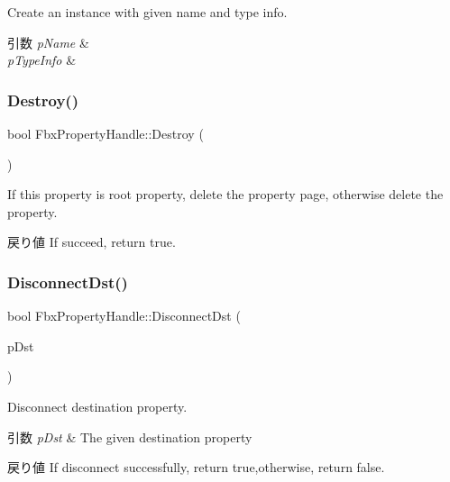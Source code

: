 Create an instance with given name and type info. 
\begin{DoxyParams}{引数}
{\em p\+Name} & \\
\hline
{\em p\+Type\+Info} & \\
\hline
\end{DoxyParams}
\mbox{\label{class_fbx_property_handle_ae7c07b84a008fbf8395375856a2b303a}} 
\subsubsection{\texorpdfstring{Destroy()}{Destroy()}}
{\footnotesize\ttfamily bool Fbx\+Property\+Handle\+::\+Destroy (\begin{DoxyParamCaption}{ }\end{DoxyParamCaption})}

If this property is root property, delete the property page, otherwise delete the property. \begin{DoxyReturn}{戻り値}
If succeed, return true. 
\end{DoxyReturn}
\mbox{\label{class_fbx_property_handle_a896af2c51a9e9b1c9cc45c20b0c17801}} 
\subsubsection{\texorpdfstring{Disconnect\+Dst()}{DisconnectDst()}}
{\footnotesize\ttfamily bool Fbx\+Property\+Handle\+::\+Disconnect\+Dst (\begin{DoxyParamCaption}\item[{const \hyperlink{class_fbx_property_handle}{Fbx\+Property\+Handle} \&}]{p\+Dst }\end{DoxyParamCaption})}

Disconnect destination property. 
\begin{DoxyParams}{引数}
{\em p\+Dst} & The given destination property \\
\hline
\end{DoxyParams}
\begin{DoxyReturn}{戻り値}
If disconnect successfully, return true,otherwise, return false. 
\end{DoxyReturn}
\mbox{\label{class_fbx_property_handle_a1e7e6be842dac23fce8708f182e9e8c3}} 
